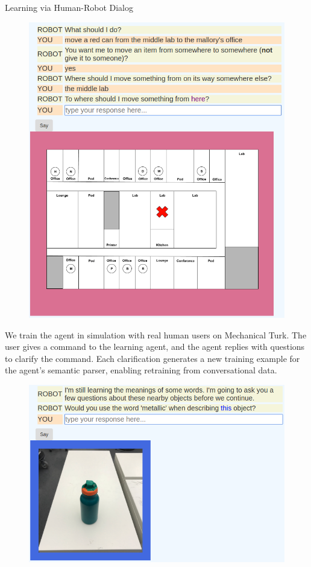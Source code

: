 \documentclass[final]{beamer}
\newcommand{\setblocksize}{\Large \centering}
\newcommand{\paragraphbreak}{\vspace{1cm}}
\begin{document}
\begin{frame}{}
\begin{columns}[t]
\begin{column}{.24\linewidth}
\begin{block}{\setblocksize Learning via Human-Robot Dialog}
{\begin{figure}
\centering
  \includegraphics[width=1\linewidth]{figures/interface_move_example.png}
  \label{fig:phm_web_interface_move}
\end{figure}

We train the agent in simulation with real human users on Mechanical Turk.
The user gives a command to the learning agent, and the agent replies with questions to clarify the command.
Each clarification generates a new training example for the agent's semantic parser, enabling retraining from conversational data.
\paragraphbreak

\begin{figure}
\centering
  \includegraphics[width=1\linewidth]{figures/interface_oal_yn_ex.png}
  \label{fig:web_interface_oal}
\end{figure}

}
\end{block}
\end{column}
\end{columns}
\end{frame}
\end{document}
